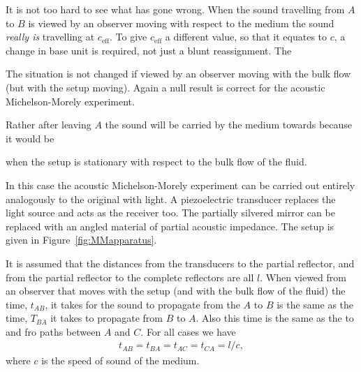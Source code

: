 \documentclass[10pt, fleqn,draft,showtrims,oldfontcommands]{article} %
\newcommand{\figref}[1]{Figure~\ref{fig:#1}}
\newcommand{\eff}{{\textrm{eff}}}
\begin{document}
It is not too hard to see what has gone wrong.
When the sound travelling from $A$ to $B$ is viewed by an observer moving with respect to the medium 
the sound {\em really is} travelling at $c_\eff$.  
To give $c_\eff$ a different value, so that it equates to $c$, 
a change in base unit is required, not just a blunt reassignment.
The 






The situation is not changed if viewed by an observer moving with the bulk flow (but with the setup moving).
Again a null result is correct for the acoustic Michelson-Morely experiment.

Rather after leaving $A$ the sound will be carried by the medium towards  because it would be

when the setup is stationary with respect to the bulk flow of the fluid.

In this case the acoustic Michelson-Morely experiment can be carried out entirely analogously to the original with light.
A piezoelectric transducer replaces the light source and acts as the receiver too.
The partially silvered mirror can be replaced with an angled material of partial acoustic impedance.
The setup is given in \figref{MMapparatus}.

It is assumed that the distances from the transducers to the partial reflector,
and from the partial reflector to the complete reflectors are all $l$.
When viewed from an observer that moves with the setup (and with the bulk flow of the fluid) 
the time, $t_{AB}$, it takes for the sound to propagate from the $A$ to $B$ is the same as the time, $T_{BA}$ it takes to propagate from $B$ to $A$.
Also this time is the same as the to and fro paths between $A$ and $C$.
For all cases we have
\begin{align}
  t_{AB}=t_{BA}=t_{AC}=t_{CA}=l/c,
\end{align}
where $c$ is the speed of sound of the medium.
\end{document}
